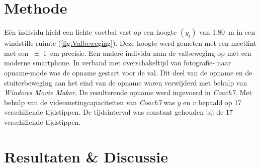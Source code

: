 \documentclass{scrartcl}
\begin{document}
\section{Methode}
E\'{e}n individu hield een lichte voetbal vast op een hoogte $(y_i)$ van \SI{1.80}{\meter} in een windstille ruimte (\cref{fig:Valbeweging}). Deze hoogte werd gemeten met een meetlint met een \SI{+-1}{\centi\meter} precisie. Een andere individu nam de valbeweging op met een moderne smartphone. In verband met overschakeltijd van fotografie- naar opname-mode was de opname gestart voor de val. Dit deel van de opname en de stuiterbeweging aan het eind van de opname waren verwijderd met behulp van \textit{Windows Movie Maker}. De resulterende opname werd ingevoerd in \textit{Coach7}. Met behulp van de videometingcapaciteiten van \textit{Coach7} was $y$ en $v$ bepaald op \num{17} verschillende tijdstippen. De tijdsinterval was constant gehouden bij de \num{17} verschillende tijdstippen.

%
\newpage
\section{Resultaten \& Discussie}
\end{document}
